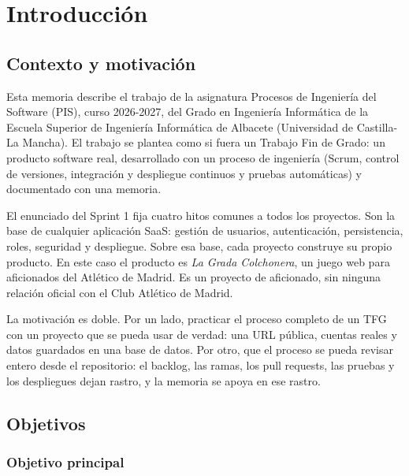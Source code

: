 \raggedbottom

\chapter{Introducción}
\label{cap:introduccion}

\section{Contexto y motivación}

Esta memoria describe el trabajo de la asignatura Procesos de Ingeniería del Software (PIS), curso 2026-2027, del Grado en Ingeniería Informática de la Escuela Superior de Ingeniería Informática de Albacete (Universidad de Castilla-La Mancha). El trabajo se plantea como si fuera un Trabajo Fin de Grado: un producto software real, desarrollado con un proceso de ingeniería (Scrum, control de versiones, integración y despliegue continuos y pruebas automáticas) y documentado con una memoria.

El enunciado del Sprint 1 fija cuatro hitos comunes a todos los proyectos. Son la base de cualquier aplicación SaaS: gestión de usuarios, autenticación, persistencia, roles, seguridad y despliegue. Sobre esa base, cada proyecto construye su propio producto. En este caso el producto es \textit{La Grada Colchonera}, un juego web para aficionados del Atlético de Madrid. Es un proyecto de aficionado, sin ninguna relación oficial con el Club Atlético de Madrid.

La motivación es doble. Por un lado, practicar el proceso completo de un TFG con un proyecto que se pueda usar de verdad: una URL pública, cuentas reales y datos guardados en una base de datos. Por otro, que el proceso se pueda revisar entero desde el repositorio: el backlog, las ramas, los pull requests, las pruebas y los despliegues dejan rastro, y la memoria se apoya en ese rastro.

\section{Objetivos}

\subsection{Objetivo principal}

